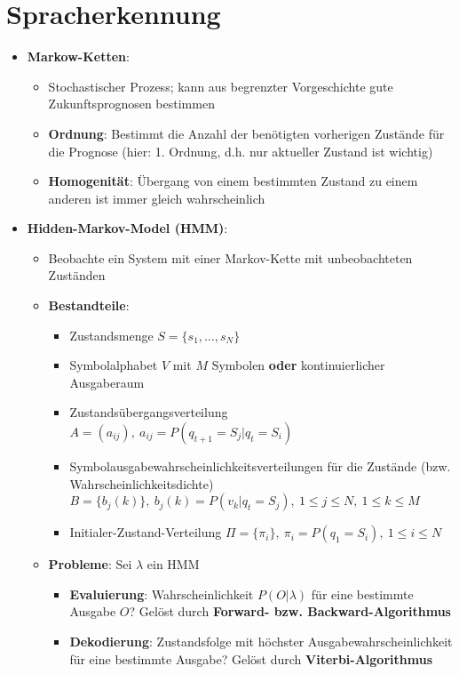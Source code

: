 \section{Spracherkennung}%
\label{sprach:sec:spracherkennung}

\begin{itemize}
	\item \textbf{Markow-Ketten}:
	\begin{itemize}
		\item Stochastischer Prozess; kann aus begrenzter Vorgeschichte gute Zukunftsprognosen bestimmen
		\item \textbf{Ordnung}: Bestimmt die Anzahl der benötigten vorherigen Zustände für die Prognose (hier: 1. Ordnung, d.h. nur aktueller Zustand ist wichtig)
		\item \textbf{Homogenität}: Übergang von einem bestimmten Zustand zu einem anderen ist immer gleich wahrscheinlich
	\end{itemize}
	\item \textbf{Hidden-Markov-Model (HMM)}:
	\begin{itemize}
		\item Beobachte ein System mit einer Markov-Kette mit unbeobachteten Zuständen
		\item \textbf{Bestandteile}:
		\begin{itemize}
			\item Zustandsmenge $S = \{s_1, \dots, s_N\}$
			\item Symbolalphabet $V$ mit $M$ Symbolen \textbf{oder} kontinuierlicher Ausgaberaum
			\item Zustandsübergangsverteilung $A = (a_{ij}),\ a_{ij} = P(q_{t+1} = S_j|q_t = S_i)$
			\item Symbolausgabewahrscheinlichkeitsverteilungen für die Zustände (bzw. Wahrscheinlichkeitsdichte) $B = \{b_j(k)\},\ b_j(k) = P(v_k | q_t = S_j),\ 1 \leq j \leq N,\ 1 \leq k \leq M$
			\item Initialer-Zustand-Verteilung $\Pi = \{\pi_i\},\ \pi_i = P(q_1 = S_i),\ 1 \leq i \leq N$
		\end{itemize}
		\item \textbf{Probleme}: Sei $\lambda$ ein HMM
		\begin{itemize}
			\item \textbf{Evaluierung}: Wahrscheinlichkeit $P(O|\lambda)$ für eine bestimmte Ausgabe $O$? Gelöst durch \textbf{Forward- bzw. Backward-Algorithmus}
			\item \textbf{Dekodierung}: Zustandsfolge mit höchster Ausgabewahrscheinlichkeit für eine bestimmte Ausgabe? Gelöst durch \textbf{Viterbi-Algorithmus}

\end{itemize}
\end{itemize}
\end{itemize}
